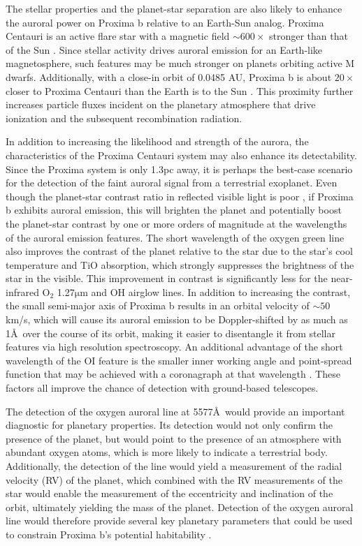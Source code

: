 \documentclass{emulateapj}
\begin{document}
The stellar properties and the planet-star separation are also likely to enhance the auroral power on Proxima b relative to an Earth-Sun analog. Proxima Centauri is an active flare star with a magnetic field ${\sim} 600\times$ stronger than that of the Sun \citep{Reiners2008,Davenport2016}. Since stellar activity drives auroral emission for an Earth-like magnetosphere, such features may be much stronger on planets orbiting active M dwarfs. Additionally, with a close-in orbit of 0.0485 AU, Proxima b is about $20\times$ closer to Proxima Centauri than the Earth is to the Sun \citep{Anglada-Escude2016}. This proximity further increases particle fluxes incident on the planetary atmosphere that drive ionization and the subsequent recombination radiation.

In addition to increasing the likelihood and strength of the aurora, the characteristics of the Proxima Centauri system may also enhance its detectability. Since the Proxima system is only 1.3pc away, it is perhaps the best-case scenario for the detection of the faint auroral signal from a terrestrial exoplanet. Even though the planet-star contrast ratio in reflected visible light is poor \citep[${\lesssim} 10^{-7}$; see][]{Turbet2016,Kreidberg2016,Meadows2016}, if Proxima b exhibits auroral emission, this will brighten the planet and potentially boost the planet-star contrast by one or more orders of magnitude at the wavelengths of the auroral emission features. The short wavelength of the oxygen green line also improves the contrast of the planet relative to the star due to the star's cool temperature and TiO absorption, which strongly suppresses the brightness of the star in the visible. This improvement in contrast is significantly less for the near-infrared O$_2$ 1.27$\mathrm{\mu}$m and OH airglow lines. In addition to increasing the contrast, the small semi-major axis of Proxima b results in an orbital velocity of ${\sim} 50$ km/s, which will cause its auroral emission to be Doppler-shifted by as much as 1\AA\ over the course of its orbit, making it easier to disentangle it from stellar features via high resolution spectroscopy. An additional advantage of the short wavelength of the OI feature is the smaller inner working angle and point-spread function that may be achieved with a coronagraph at that wavelength \citep{Agol2007}. These factors all improve the chance of detection with ground-based telescopes.

The detection of the oxygen auroral line at 5577\AA\ would provide an important diagnostic for planetary properties. Its detection would not only confirm the presence of the planet, but would point to the presence of an atmosphere with abundant oxygen atoms, which is more likely to indicate a terrestrial body. Additionally, the detection of the line would yield a measurement of the radial velocity (RV) of the planet, which combined with the RV measurements of the star \citep{Anglada-Escude2016} would enable the measurement of the eccentricity and inclination of the orbit, ultimately yielding the mass of the planet. Detection of the oxygen auroral line would therefore provide several key planetary parameters that could be used to constrain Proxima b's potential habitability \citep{Barnes2016,Meadows2016}.
\end{document}
